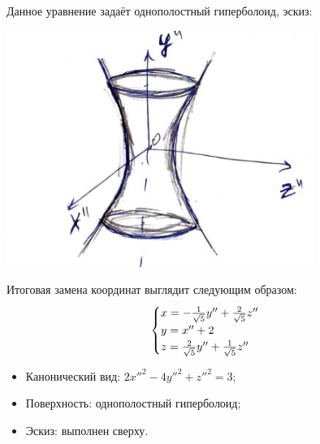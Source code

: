 Данное уравнение задаёт однополостный гиперболоид, эскиз:
\begin{center}
    \includegraphics[width=10cm]{source/7.jpg}
\end{center}

\newpage

Итоговая замена координат выглядит следующим образом:
\[
    \begin{cases}
        x = -\frac{1}{\sqrt{5}}y'' + \frac{2}{\sqrt{5}}z'' \\
        y = x'' + 2                                  \\
        z = \frac{2}{\sqrt{5}}y'' + \frac{1}{\sqrt{5}}z''
    \end{cases}
\]

\begin{itemize}
    \item Канонический вид: $2{x''}^2 - 4{y''}^2 + {z''}^2 = 3$;
    \item Поверхность: однополостный гиперболоид;
    \item Эскиз: выполнен сверху.
\end{itemize}
